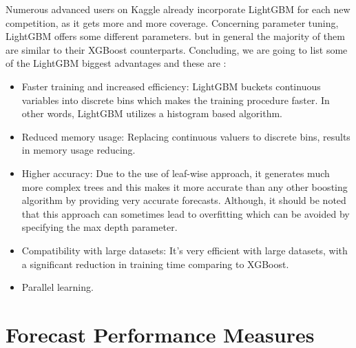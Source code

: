 \par Numerous advanced users on Kaggle already incorporate LightGBM for each new competition, as it gets more and more coverage. Concerning parameter tuning, LightGBM offers some different parameters. but in general the majority of them are similar to their XGBoost counterparts. Concluding, we are going to list some of the LightGBM biggest advantages and these are \cite{NIPS2017_6907}:
\begin{itemize}
    \item Faster training and increased efficiency: LightGBM buckets continuous variables into discrete bins which makes the training procedure faster. In other words, LightGBM utilizes a histogram based algorithm.
    \item Reduced memory usage: Replacing continuous valuers to discrete bins, results in memory usage reducing.
    \item Higher accuracy: Due to the use of leaf-wise approach, it generates much more complex trees and this makes it more accurate than any other boosting algorithm by providing very accurate forecasts.
    Although, it should be noted that this approach can sometimes lead to overfitting which can be avoided by specifying the max depth parameter.
    \item Compatibility with large datasets: It's very efficient with large datasets, with a significant reduction in training time comparing to XGBoost.
    \item Parallel learning.
\end{itemize}

 \newpage   
\chapter{Forecast Performance Measures}
